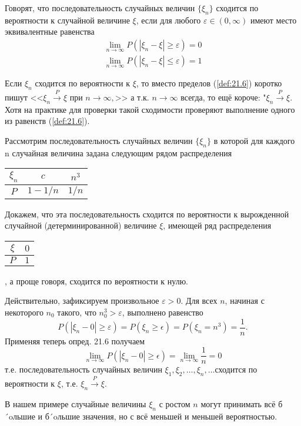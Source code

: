\begin{definition}
	Говорят, что последовательность случайных величин $\{\xi_n\}$ сходится по вероятности к случайной величине $\xi$, если для любого
$\varepsilon \in (0,\infty)$ имеют место эквивалентные равенства
\begin{gather*}
\label{def:21.6}
	\lim_{n\to\infty}P(|\xi_n- \xi|\geqslant \varepsilon)=0 \\
	\lim_{n\to\infty}P(|\xi_n- \xi|\leqslant \varepsilon)=1 \tag{*}
\end{gather*}

\end{definition}
Если ${\xi_n}$ сходится по вероятности к $\xi$, то вместо пределов (\ref{def:21.6}) коротко пишут <<$\xi_n\stackrel{P}{\to} \xi$ при $n \to \infty,$>> а т.к. $n \to \infty$ всегда, то ещё короче: "$\xi_n\stackrel{P}{\to} \xi$.
Хотя на практике для проверки такой сходимости проверяют выполнение
одного из равенств (\ref{def:21.6}).
\begin{example}
Рассмотрим последовательность случайных величин $\{\xi_n\}$ в которой для каждого n случайная величина задана следующим рядом распределения
\begin{center}
	\begin{tabular}{|c|c|c|}
	\hline
	$\xi_n$ & $c$& $n^3$\\ \hline
	$P$ & $1-1/n$& $1/n$\\ \hline
	\end{tabular}	
\end{center}

	Докажем, что эта последовательность сходится по вероятности к вырожденной случайной (детерминированной) величине $\xi$, имеющей ряд распределения
	\begin{tabular}{|c|c|}
	\hline
	$\xi$ & $0$\\ \hline
	$P$ & $1$\\ \hline
	\end{tabular}, а проще говоря, сходится по вероятности к нулю.

	Действительно, зафиксируем произвольное $\varepsilon > 0$. Для всех $n$, начиная
с некоторого $n_0$ такого, что $n^3_0>\varepsilon$, выполнено равенство
\begin{equation*}
	P(|\xi_n-0|\geqslant\varepsilon)=P(\xi_n\geqslant\epsilon)=P(\xi_n=n^3)=\frac{1}{n}.
\end{equation*}
Применяя теперь опред. 21.6 получаем
\begin{equation*}
	\lim\limits_{n\to\infty} P(|\xi_n-0|\geqslant\epsilon)=\lim\limits_{n\to\infty}\frac{1}{n}=0
\end{equation*}
т.е. последовательность случайных величин $\xi_1, \xi_2, \dots , \xi_n, \dots $сходится по вероятности к $\xi$, т.е. $\xi_n \stackrel{P}{\to}\xi$.

В нашем примере случайные величины $\xi_n$ с ростом $n$ могут принимать
всё б´oльшие и б´oльшие значения, но с всё меньшей и меньшей вероятностью.
\end{example}


